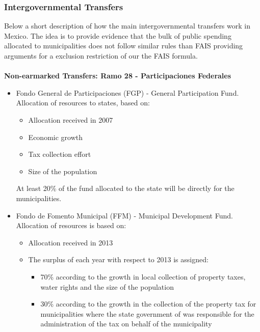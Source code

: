 \documentclass[dv_diss_main.tex]{subfiles}
\begin{document}
\subsubsection{Intergovernmental Transfers}\label{intertransfer}

Below a short description of how the main intergovernmental transfers work in Mexico. The idea is to provide evidence that the bulk of public spending allocated to municipalities does not follow similar rules than FAIS providing arguments for a exclusion restriction of our the FAIS formula.
\\
\\
{\bf Non-earmarked Transfers: Ramo 28 - Participaciones Federales}

\begin{itemize}
    \item 	Fondo General de Participaciones (FGP) - General Participation Fund. Allocation of resources to states, based on:
    \begin{itemize}
        \item Allocation received in 2007
        \item Economic growth
        \item Tax collection effort
        \item Size of the population
    \end{itemize}
    
    At least 20\% of the fund allocated to the state will be directly for the municipalities.
    
    \item Fondo de Fomento Municipal (FFM) - Municipal Development Fund. Allocation of resources is based on:

    \begin{itemize}
        \item Allocation received in 2013
        \item The surplus of each year with respect to 2013 is assigned:
        \begin{itemize}
            \item 70\% according to the growth in local collection of property taxes, water rights and the size of the population
            \item 30\% according to the growth in the collection of the property tax for municipalities where the state government of was responsible for the administration of the tax on behalf of the municipality
        \end{itemize}
        

\end{itemize}
\end{itemize}
\end{document}
